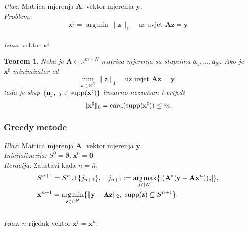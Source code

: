 \documentclass{beamer}
\newtheorem{thm}{Teorem}[section]
\newcommand{\R}{\mathbb{R}}
\newcommand{\C}{\mathbb{C}}
\newcommand{\vect}[1]{\mathbf{#1}}
\renewcommand{\vec}{\vect}
\newcommand{\card}{\text{\normalfont{card}}}
\newcommand{\supp}{\text{\normalfont{supp}}}
\newcommand{\norm}[1]{\|{#1}\|}
\DeclareMathOperator*{\argmax}{arg\,max}
\DeclareMathOperator*{\argmin}{arg\,min}
\newenvironment{alg}[1]
{
    \bigskip
    \begin{tcolorbox}[arc=0mm,boxrule=1.2pt,colframe=black,colback=white,detach title, before upper={\medskip\begin{center}\textbf{#1}\end{center}\hline\newline\medskip},frame hidden]
    \medskip
}
{
    \medskip
\end{tcolorbox}
}
\begin{document}
\begin{frame}
    \begin{alg}{$\ell_1$-minimizacija (\textit{Basis Pursuit})}
    \textit{Ulaz:} Matrica mjerenja $\vec A$, vektor mjerenja $\vec y$. \\
    \textit{Problem:}
        \begin{equation}
            \vec x^{\sharp} = \argmin \norm{\vec z}_1 \quad \text{uz uvjet }\vec{Az}=\vec y\tag{$\ell_1-min$}\label{algoritam_l1_minimizacija}
        \end{equation} \\
        \textit{Izlaz:} vektor $\vec x^{\sharp}$
\end{alg}
\end{frame}

\begin{frame}
\begin{thm}
    Neka je $\vec A \in \R^{m \times N}$ matrica mjerenja sa stupcima $\vec a_1, \dots, \vec a_N$. Ako je $\vec x^{\sharp}$ minimizator od
    \begin{equation*}
        \min_{\vec z \in \R^N} \norm{\vec z}_1\quad \text{uz uvjet } \vec{Az}=\vec y,
    \end{equation*}
    tada je skup $\{\vec a_j,\ j \in \supp(\vec x^{\sharp})\}$ linearno nezavisan i vrijedi
    \begin{equation*}
        \norm{\vec{x}^{\sharp}}_0 = \card(\supp(\vec x^{\sharp})) \leq m. 
    \end{equation*}
\end{thm}
\end{frame}

\begin{frame}
    \frametitle{Greedy metode}
    \begin{alg}{OMP (\textit{Orthogonal matching pursuit})}
    \textit{Ulaz:} Matrica mjerenja $\vec A$, vektor mjerenja $\vec y$. \\
    \textit{Inicijalizacija:} $S^0 = \emptyset$, $\vec x^0 = \vec 0$ \\
    \textit{Iteracija:} Zaustavi kada $n = \bar{n}$:
        \begin{align*}
            &S^{n+1} = S^n \cup \{j_{n+1}\},\quad j_{n+1} := \argmax\limits_{j \in [N]}\{|(\vec A^*(\vec y - \vec{Ax}^n))_j|\},
        \\
            &\vec x^{n+1} = \argmin\limits_{\vec z \in \C^N}\{\norm{\vec y - \vec{Az}}_2,\ \supp(\vec z) \subseteq S^{n+1}\}.
        \end{align*} \\
        \textit{Izlaz:} $\bar{n}$-rijedak vektor $\vec x^{\sharp}=\vec{x}^{\bar{n}}$.
\end{alg}
\end{frame}
\end{document}
